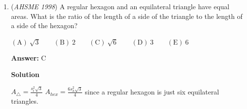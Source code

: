 \begin{enumerate}
 Thus $\boxed{A}$ is the right answer - only $a$ is positive.

 



\textbf{Solution 2 (Inequality Logic)}

The vertex is given to be $(4, -5)$. This means the equation can be written as $y = a(x - 4)^2 - 5$.

 Since there are 2 $x$-intercepts, the parabola must open up and so $a > 0$.

 Expanding the vertex form gives:
 \[y = a(x^2 - 8x + 16) - 5\]
 \[y = ax^2 - 8ax + 16a - 5\]

 Thus we have $b = -8a$ and $c = 16a - 5$.

 Since $a > 0$, we must have that $-8a < 0$ and thus that $b < 0$.

 To determine the sign of $c$, we find the $x$-intercepts by setting $y = 0$:
 \[a(x - 4)^2 - 5 = 0\]
 \[a(x - 4)^2 = 5\]
 \[(x - 4)^2 = \frac{5}{a}\]
 \[x = 4 \pm \sqrt{\frac{5}{a}}\]

 The problem states there is exactly one negative root. This means the smaller of the two roots must be less than zero:
 \[4 - \sqrt{\frac{5}{a}} < 0\]
 \[4 < \sqrt{\frac{5}{a}}\]

 Since both sides are strictly positive, we can square the inequality:
 \[16 < \frac{5}{a}\]

 Because $a > 0$, we can multiply by $a$ without changing the direction of the inequality sign:
 \[16a < 5\]
 \[16a - 5 < 0\]

 Since our expansion gave that $c = 16a - 5$, this shows that $c < 0$. Therefore, $\boxed{\text{only } a \text{ is positive}}$.

 


	\item (\textit{AHSME 1998}) A regular hexagon and an equilateral triangle have equal areas. What is the ratio of the length of a side of the triangle to the length of a side of the hexagon?


 $\mathrm{(A) \ }\sqrt{3} \qquad \mathrm{(B) \ }2 \qquad \mathrm{(C) \ }\sqrt{6} \qquad \mathrm{(D) \ }3 \qquad \mathrm{(E) \ }6$

 \textbf{Answer: }C



\textbf{Solution}

$A_{\triangle} = \frac{s_t^2\sqrt{3}}{4}$
$A_{hex} = \frac{6s_h^2\sqrt{3}}{4}$ since a regular hexagon is just six equilateral triangles.


\end{enumerate}
